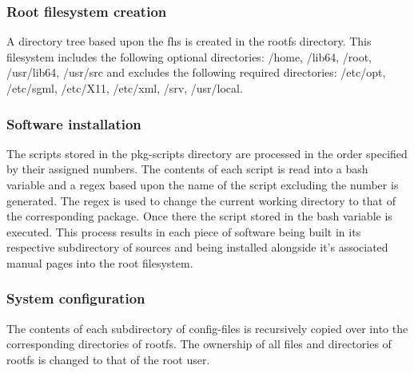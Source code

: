 
\subsubsection{Root filesystem creation}

A directory tree based upon the \gls{fhs} \cite{fhs} is created in the rootfs directory. This filesystem includes the following optional directories: /home, /lib64, /root, /usr/lib64, /usr/src and excludes the following required directories: /etc/opt, /etc/sgml, /etc/X11, /etc/xml, /srv, /usr/local.

\subsubsection{Software installation}

The scripts stored in the pkg-scripts directory are processed in the order specified by their assigned numbers. The contents of each script is read into a bash variable and a \gls{regex} based upon the name of the script excluding the number is generated. The \gls{regex} is used to change the current working directory to that of the corresponding package. Once there the script stored in the bash variable is executed. This process results in each piece of software being built in its respective subdirectory of sources and being installed alongside it's associated manual pages into the root filesystem.


\subsubsection{System configuration}

The contents of each subdirectory of config-files is recursively copied over into the corresponding directories of rootfs. The ownership of all files and directories of rootfs is changed to that of the root user.



